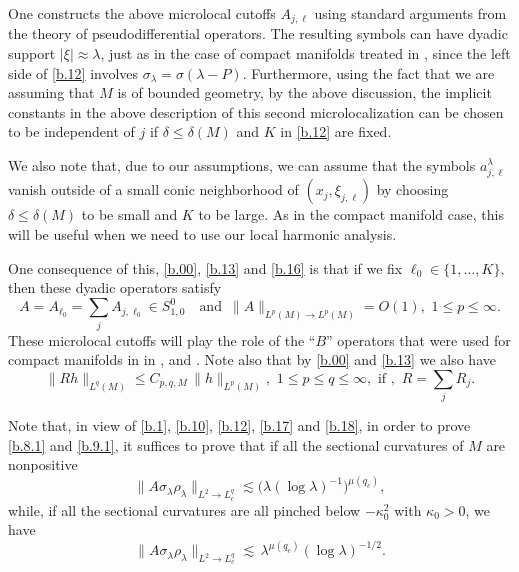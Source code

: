 \documentclass[10pt]{amsart}
\newcommand{\la}{\lambda}
\newcommand{\1}{{\bf 1}}
\begin{document}
One constructs the above microlocal cutoffs $A_{j,\ell}$ using standard arguments
from the theory of pseudodifferential operators.  The resulting symbols can have
dyadic support $|\xi|\approx \la$, just as in the case of compact manifolds treated
in \cite{HSp}, since the left side of \eqref{b.12} involves $\sigma_\la = \sigma(\la-P)$.
Furthermore, using the fact that we are assuming that $M$ is of bounded geometry,
by the above discussion, the implicit constants in the above description of this
second microlocalization
 can be chosen to be independent 
of $j$ if $\delta\le \delta(M)$  and $K$ in \eqref{b.12}
are fixed.  


We also note that, due to our assumptions,
we can assume that the symbols $a^\la_{j,\ell}$ vanish
outside of a small conic neighborhood of $(x_j,\xi_{j,\ell})$ 
by choosing $\delta\le 
\delta(M)$ to be small and $K$ to be large. As in the 
compact manifold case, this will be useful when we
need to use our local harmonic analysis.


One consequence of this, \eqref{b.00}, \eqref{b.13} and \eqref{b.16} is that if we fix
$\ell_0\in \{1,\dots,K\}$, then
these dyadic operators satisfy
\begin{equation}\label{b.17}
A=A_{\ell_0} = \sum_{j}A_{j,\ell_0}\in S^0_{1,0}
\quad \text{and } \, 
\|A\|_{L^p(M)\to L^p(M)}=O(1), \, \, 1\le p\le \infty.
\end{equation}
These microlocal cutoffs will play the role of the ``$B$'' operators 
that were used for compact manifolds in 
in \cite{BHSsp}, \cite{SBLOg} and \cite{HSp}.
Note also that by \eqref{b.00} and \eqref{b.13} we also have
\begin{equation}\label{b.18}
\|Rh\|_{L^q(M)} \le C_{p,q,M} \, \|h\|_{L^p(M)}, \, \, 1\le p\le q\le \infty, \, \,
\text{if }, \, \, R=\sum_j R_j.
\end{equation}


Note that, in view of \eqref{b.1}, \eqref{b.10}, \eqref{b.12}, \eqref{b.17} and \eqref{b.18}, in order
to prove \eqref{b.8.1} and \eqref{b.9.1}, it suffices to
prove that if all the sectional curvatures of
$M$ are nonpositive
\begin{equation}\label{b.20}
\| A \sigma_\la \rho_\la \|_{L^2\to L^q_c}\lesssim
\bigl(\la(\log\la)^{-1}\bigr)^{\mu(q_c)}, 
\end{equation}
while, if all the sectional curvatures are all pinched below $-\kappa^2_0$ with $\kappa_0>0$, we have
\begin{equation}\label{b.21}
\| A\sigma_\la \rho_\la \|_{L^2\to L^q_c}\lesssim \, \la^{\mu(q_c)}(\log\la)^{-1/2}.
\end{equation}
\end{document}
